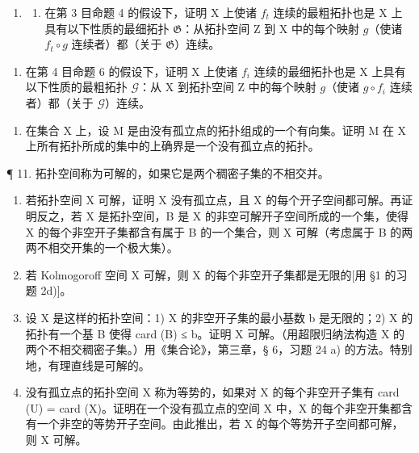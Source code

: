 \begin{enumerate}
\def\labelenumi{\arabic{enumi})}
\setcounter{enumi}{8}
\tightlist
\item
  \begin{enumerate}
  \def\labelenumii{\alph{enumii})}
  \tightlist
  \item
    在第 3 目命题 4 的假设下，证明 X 上使诸 \(f_{t}\) 连续的最粗拓扑也是 X 上具有以下性质的最细拓扑 \(\mathfrak{G}\)：从拓扑空间 Z 到 X 中的每个映射 \(g\)（使诸 \(f_{t} \circ g\) 连续者）都（关于 \(\mathfrak{G}\)）连续。
  \end{enumerate}
\end{enumerate}

\begin{enumerate}
\def\labelenumi{\alph{enumi})}
\setcounter{enumi}{1}
\tightlist
\item
  在第 4 目命题 6 的假设下，证明 X 上使诸 \(f_{i}\) 连续的最细拓扑也是 X 上具有以下性质的最粗拓扑 \(\mathcal{G}\)：从 X 到拓扑空间 Z 中的每个映射 \(g\)（使诸 \(g \circ f_{i}\) 连续者）都（关于 \(\mathcal{G}\)）连续。
\end{enumerate}

\begin{enumerate}
\def\labelenumi{\arabic{enumi}.}
\setcounter{enumi}{9}
\tightlist
\item
  在集合 X 上，设 M 是由没有孤立点的拓扑组成的一个有向集。证明 M 在 X 上所有拓扑所成的集中的上确界是一个没有孤立点的拓扑。
\end{enumerate}

¶ 11. 拓扑空间称为可解的，如果它是两个稠密子集的不相交并。

\begin{enumerate}
\def\labelenumi{\alph{enumi})}
\item
  若拓扑空间 X 可解，证明 X 没有孤立点，且 X 的每个开子空间都可解。再证明反之，若 X 是拓扑空间，B 是 X 的非空可解开子空间所成的一个集，使得 X 的每个非空开子集都含有属于 B 的一个集合，则 X 可解（考虑属于 B 的两两不相交开集的一个极大集）。
\item
  若 Kolmogoroff 空间 X 可解，则 X 的每个非空开子集都是无限的{[}用 §1 的习题 2d){]}。
\item
  设 X 是这样的拓扑空间：1) X 的非空开子集的最小基数 b 是无限的；2) X 的拓扑有一个基 B 使得 card (B) ≤ b。证明 X 可解。（用超限归纳法构造 X 的两个不相交稠密子集。）用《集合论》，第三章，§ 6，习题 24 a) 的方法。特别地，有理直线是可解的。
\item
  没有孤立点的拓扑空间 X 称为等势的，如果对 X 的每个非空开子集有 card (U) = card (X)。证明在一个没有孤立点的空间 X 中，X 的每个非空开集都含有一个非空的等势开子空间。由此推出，若 X 的每个等势开子空间都可解，则 X 可解。
\end{enumerate}

